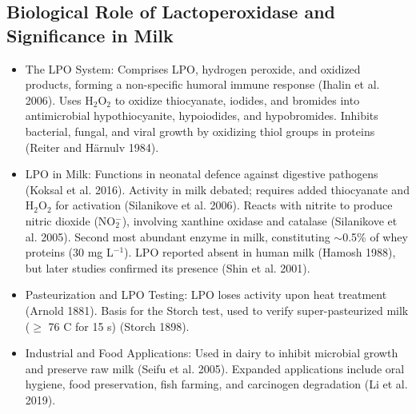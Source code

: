 \subsection*{Biological Role of Lactoperoxidase and Significance in Milk}
\begin{itemize}
    \item The LPO System:
    \subitem Comprises LPO, hydrogen peroxide, and oxidized products, forming a non-specific humoral immune response (Ihalin et al. 2006).
    \subitem Uses H$_2$O$_2$ to oxidize thiocyanate, iodides, and bromides into antimicrobial hypothiocyanite, hypoiodides, and hypobromides.
    \subitem Inhibits bacterial, fungal, and viral growth by oxidizing thiol groups in proteins (Reiter and Härnulv 1984).

    \item LPO in Milk:
    \subitem Functions in neonatal defence against digestive pathogens (Koksal et al. 2016).
    \subitem Activity in milk debated; requires added thiocyanate and H$_2$O$_2$ for activation (Silanikove et al. 2006).
    \subitem Reacts with nitrite to produce nitric dioxide (NO$_2^-$), involving xanthine oxidase and catalase (Silanikove et al. 2005).
    \subitem Second most abundant enzyme in milk, constituting $\sim$0.5\% of whey proteins (30 mg L$^{-1}$).
    \subitem LPO reported absent in human milk (Hamosh 1988), but later studies confirmed its presence (Shin et al. 2001).

    \item Pasteurization and LPO Testing:
    \subitem LPO loses activity upon heat treatment (Arnold 1881).
    \subitem Basis for the Storch test, used to verify super-pasteurized milk ($\geq$ 76 \textdegree C for 15 s) (Storch 1898).

    \item Industrial and Food Applications:
    \subitem Used in dairy to inhibit microbial growth and preserve raw milk (Seifu et al. 2005).
    \subitem Expanded applications include oral hygiene, food preservation, fish farming, and carcinogen degradation (Li et al. 2019).
\end{itemize}

